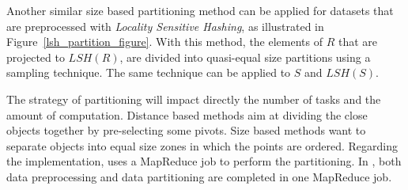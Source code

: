 Another similar size based partitioning method can be applied for datasets that are preprocessed with \emph{Locality Sensitive Hashing}, as illustrated in 
Figure~\ref{lsh_partition_figure}. With this method, the elements of $R$ that are projected to $LSH(R)$, are divided into 
quasi-equal size partitions using a sampling technique. The same technique can be applied to $S$ and $LSH(S)$. 



The strategy of partitioning will impact directly the number of tasks and the amount of computation. Distance based methods aim at dividing the close objects together by pre-selecting some pivots. Size based methods want to separate objects into equal size zones in which the points are ordered.
Regarding the implementation, \cite{Lu:2012:EPK:2336664.2336674} uses a MapReduce job to 
perform the partitioning. In \cite{Zhang:2012:EPK:
2247596.2247602}, both data preprocessing and data partitioning are completed in one MapReduce job.

